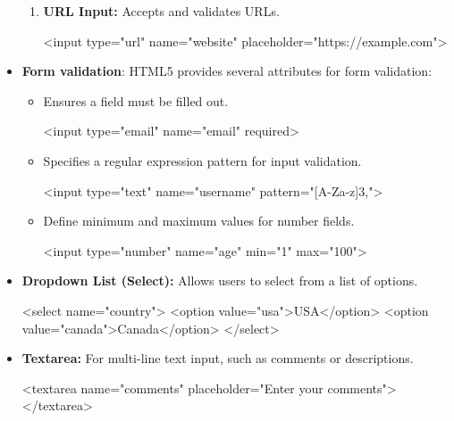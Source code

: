 \documentclass{report}
\begin{document}
\begin{itemize}
\begin{enumerate}
            \item \textbf{URL Input:} Accepts and validates URLs.
                \bigbreak \noindent 
                \begin{htmlcode}
                    <input type="url" name="website" placeholder="https://example.com">
                \end{htmlcode}
        \end{enumerate}
    \item \textbf{Form validation}: HTML5 provides several attributes for form validation:
        \begin{itemize}
            \item {} Ensures a field must be filled out.
                \bigbreak \noindent 
                \begin{htmlcode}
                    <input type="email" name="email" required>
                \end{htmlcode}
            \item {} Specifies a regular expression pattern for input validation.
                \bigbreak \noindent 
                \begin{htmlcode}
                    <input type="text" name="username" pattern="[A-Za-z]{3,}">
                \end{htmlcode}
            \item {} Define minimum and maximum values for number fields.
                \bigbreak \noindent 
                \begin{htmlcode}
                    <input type="number" name="age" min="1" max="100">
                \end{htmlcode}
        \end{itemize}
    \item \textbf{Dropdown List (Select):} Allows users to select from a list of options.
        \bigbreak \noindent 
        \begin{htmlcode}
            <select name="country">
                <option value="usa">USA</option>
                <option value="canada">Canada</option>
            </select>
        \end{htmlcode}
    \item \textbf{Textarea:} For multi-line text input, such as comments or descriptions.
        \bigbreak \noindent 
        \begin{htmlcode}
            <textarea name="comments" placeholder="Enter your comments"></textarea>
        \end{htmlcode}

\end{itemize}
\end{document}
